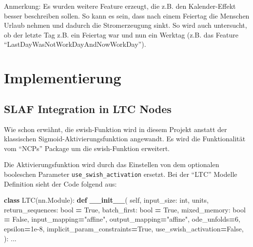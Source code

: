 \documentclass[11pt,ngerman,a4paper,]{article}
\newenvironment{Shaded}{\begin{snugshade}}{\end{snugshade}}
\newcommand{\BuiltInTok}[1]{#1}
\newcommand{\DecValTok}[1]{\textcolor[rgb]{0.00,0.00,0.81}{#1}}
\newcommand{\FloatTok}[1]{\textcolor[rgb]{0.00,0.00,0.81}{#1}}
\newcommand{\FunctionTok}[1]{\textcolor[rgb]{0.13,0.29,0.53}{\textbf{#1}}}
\newcommand{\KeywordTok}[1]{\textcolor[rgb]{0.13,0.29,0.53}{\textbf{#1}}}
\newcommand{\NormalTok}[1]{#1}
\newcommand{\OperatorTok}[1]{\textcolor[rgb]{0.81,0.36,0.00}{\textbf{#1}}}
\newcommand{\StringTok}[1]{\textcolor[rgb]{0.31,0.60,0.02}{#1}}
\newcommand{\VariableTok}[1]{\textcolor[rgb]{0.00,0.00,0.00}{#1}}
\begin{document}
Anmerkung: Es wurden weitere Feature erzeugt, die z.B. den Kalender-Effekt besser beschreiben sollen. So kann es sein, dass nach einem Feiertag die Menschen Urlaub nehmen und dadurch die Stromerzeugung sinkt. So wird auch untersucht, ob der letzte Tag z.B. ein Feiertag war und nun ein Werktag (z.B. das Feature ``LastDayWasNotWorkDayAndNowWorkDay'').

\clearpage
\newpage

\section{Implementierung}\label{implementierung}

\subsection{SLAF Integration in LTC Nodes}\label{slaf-integration-in-ltc-nodes}

Wie schon erwähnt, die swish-Funktion wird in diesem Projekt anstatt der klassischen Sigmoid-Aktivierungsfunktion angewandt. Es wird die Funktionalität vom ``NCPs'' Package um die swish-Funktion erweitert.

Die Aktivierungsfunktion wird durch das Einstellen von dem optionalen booleschen Parameter \texttt{use\_swish\_activation} ersetzt. Bei der ``LTC'' Modelle Definition sieht der Code folgend aus:

\singlespacing

\begin{Shaded}
\begin{Highlighting}[numbers=left,,]
\KeywordTok{class}\NormalTok{ LTC(nn.Module):}
    \KeywordTok{def} \FunctionTok{\_\_init\_\_}\NormalTok{(}
        \VariableTok{self}\NormalTok{,}
\NormalTok{        input\_size: }\BuiltInTok{int}\NormalTok{,}
\NormalTok{        units,}
\NormalTok{        return\_sequences: }\BuiltInTok{bool} \OperatorTok{=} \VariableTok{True}\NormalTok{,}
\NormalTok{        batch\_first: }\BuiltInTok{bool} \OperatorTok{=} \VariableTok{True}\NormalTok{,}
\NormalTok{        mixed\_memory: }\BuiltInTok{bool} \OperatorTok{=} \VariableTok{False}\NormalTok{,}
\NormalTok{        input\_mapping}\OperatorTok{=}\StringTok{"affine"}\NormalTok{,}
\NormalTok{        output\_mapping}\OperatorTok{=}\StringTok{"affine"}\NormalTok{,}
\NormalTok{        ode\_unfolds}\OperatorTok{=}\DecValTok{6}\NormalTok{,}
\NormalTok{        epsilon}\OperatorTok{=}\FloatTok{1e{-}8}\NormalTok{,}
\NormalTok{        implicit\_param\_constraints}\OperatorTok{=}\VariableTok{True}\NormalTok{,}
\NormalTok{        use\_swish\_activation}\OperatorTok{=}\VariableTok{False}\NormalTok{,}
\NormalTok{    ):}
\NormalTok{      ...}
\end{Highlighting}
\end{Shaded}
\end{document}
